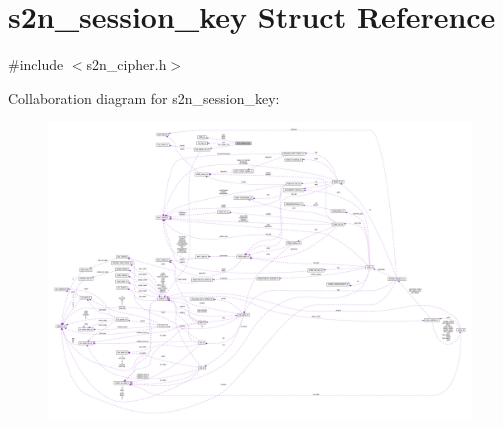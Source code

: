 \hypertarget{structs2n__session__key}{}\section{s2n\+\_\+session\+\_\+key Struct Reference}
\label{structs2n__session__key}


{\ttfamily \#include $<$s2n\+\_\+cipher.\+h$>$}



Collaboration diagram for s2n\+\_\+session\+\_\+key\+:\nopagebreak
\begin{figure}[H]
\begin{center}
\leavevmode
\includegraphics[width=350pt]{structs2n__session__key__coll__graph}
\end{center}
\end{figure}
